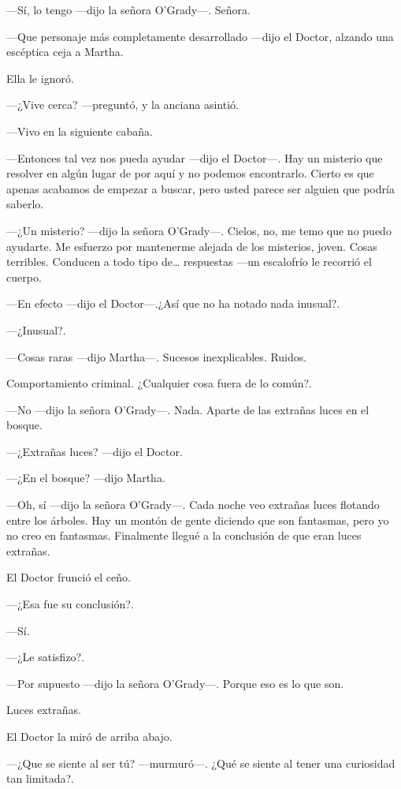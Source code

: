 ---Sí, lo tengo ---dijo la señora O'Grady---. Señora.

---Que personaje más completamente desarrollado ---dijo el Doctor, alzando una escéptica ceja a Martha.

Ella le ignoró.

---¿Vive cerca? ---preguntó, y la anciana asintió.

---Vivo en la siguiente cabaña.

---Entonces tal vez nos pueda ayudar ---dijo el Doctor---. Hay un misterio que resolver en algún lugar de por aquí y no podemos encontrarlo. Cierto es que apenas acabamos de empezar a buscar, pero usted parece ser alguien que podría saberlo.

---¿Un misterio? ---dijo la señora O'Grady---. Cielos, no, me temo que no puedo ayudarte. Me esfuerzo por mantenerme alejada de los misterios, joven. Cosas terribles. Conducen a todo tipo de\ldots{} respuestas ---un escalofrío le recorrió el cuerpo.

---En efecto ---dijo el Doctor---.¿Así que no ha notado nada inusual?.

---¿Inusual?.

---Cosas raras ---dijo Martha---. Sucesos inexplicables. Ruidos.

Comportamiento criminal. ¿Cualquier cosa fuera de lo común?.

---No ---dijo la señora O'Grady---. Nada. Aparte de las extrañas luces en el bosque.

---¿Extrañas luces? ---dijo el Doctor.

---¿En el bosque? ---dijo Martha.

---Oh, sí ---dijo la señora O'Grady---. Cada noche veo extrañas luces flotando entre los árboles. Hay un montón de gente diciendo que son fantasmas, pero yo no creo en fantasmas. Finalmente llegué a la conclusión de que eran luces extrañas.

El Doctor frunció el ceño.

---¿Esa fue su conclusión?.

---Sí.

---¿Le satisfizo?.

---Por supuesto ---dijo la señora O'Grady---. Porque eso es lo que son.

Luces extrañas.

El Doctor la miró de arriba abajo.

---¿Que se siente al ser tú? ---murmuró---. ¿Qué se siente al tener una curiosidad tan limitada?.

